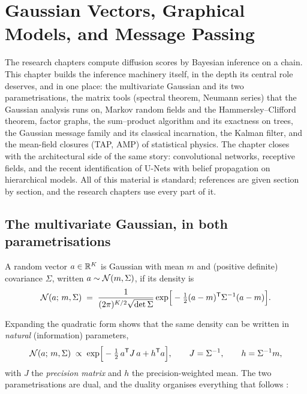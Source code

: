 \chapter{Gaussian Vectors, Graphical Models, and Message Passing}
\label{ch:graphs}\label{ch:bp}

The research chapters compute diffusion scores by Bayesian inference on a
chain. This chapter builds the inference machinery itself, in the depth
its central role deserves, and in one place: the multivariate Gaussian
and its two parametrisations, the matrix tools (spectral theorem,
Neumann series) that the Gaussian analysis runs on, Markov random fields
and the Hammersley--Clifford theorem, factor graphs, the sum--product
algorithm and its exactness on trees, the Gaussian message family and its
classical incarnation, the Kalman filter, and the mean-field closures
(TAP, AMP) of statistical physics. The chapter closes with the
architectural side of the same story: convolutional networks, receptive
fields, and the recent identification of U-Nets with belief propagation
on hierarchical models. All of this material is standard; references
are given section by section, and the research chapters use every part
of it.

\section{The multivariate Gaussian, in both parametrisations}
\label{sec:gauss-vectors}

\begin{definition}\label{def:gaussian}
A random vector $a \in \mathbb{R}^K$ is Gaussian with mean $m$ and (positive
definite) covariance $\Sigma$, written $a \sim \mathcal{N}(m, \Sigma)$, if its
density is
\begin{equation}
  \mathcal{N}(a;\, m, \Sigma)
  \;=\; \frac{1}{(2\pi)^{K/2} \sqrt{\det \Sigma}}
  \exp\!\Big[ -\tfrac{1}{2} (a - m)^{\mathsf{T}} \Sigma^{-1} (a - m) \Big] .
  \label{eq:gauss-density}
\end{equation}
\end{definition}

Expanding the quadratic form shows that the same density can be written
in \emph{natural} (information) parameters,
\begin{equation}
  \mathcal{N}(a;\, m, \Sigma) \;\propto\;
  \exp\!\Big[ -\tfrac{1}{2}\, a^{\mathsf{T}} J\, a + h^{\mathsf{T}} a \Big],
  \qquad
  J = \Sigma^{-1},
  \qquad
  h = \Sigma^{-1} m ,
  \label{eq:gauss-natural}
\end{equation}
with $J$ the \emph{precision matrix} and $h$ the precision-weighted mean.
The two parametrisations are dual, and the duality organises everything
that follows \citep{bishop2006pattern, koller2009probabilistic}:

